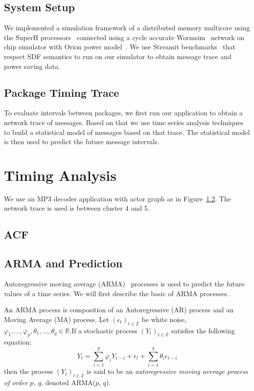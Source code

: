 \documentclass[12pt]{article}
\begin{document}
\subsection{System Setup}
We implemented a simulation framework of a distributed memory multicore using
the SuperH processors~\cite{Stanley-MarbellSunflower} connected using a
cycle accurate Wormsim~\cite{Wormsim} network on chip simulator with Orion power
model~\cite{WangOrion}. We use Streamit benchmarks~\cite{ThiesStreamIt} that
respect SDF semantics to run on our simulator to obtain message trace and power
saving data.

\subsection{Package Timing Trace}
To evaluate intervals between packages, we first run our application to obtain a
network trace of messages. Based on that we use time series analysis
techniques~\cite{BrillingerTimeSeries, ShumwayTimeSeries} to build a statistical
model of messages based on that trace. The statistical model is then used to
predict the future message intervals. 
\section{Timing Analysis}
We use an MP3 decoder application with actor graph as in Figure~\ref{}. The
network trace is used is between cluster 4 and 5.

\subsection{ACF}
\subsection{ARMA and Prediction}
Autoregressive moving average (ARMA)~\cite{BoxTimeSeries, FalkStatSAS}
 processes is used to predict the future values of a time series. We will first
 describe the basic of ARMA processes.
 
 An ARMA process is composition of an Autoregressive (AR) process and an Moving
 Average (MA) process. Let $(\epsilon_t)_{t\in \mathbb{Z}}$ be white noise,
 $\varphi_1, \ldots, \varphi_p, \theta_1, \ldots, \theta_q\in\mathbb{R}$.If a
stochastic process $(Y_t)_{t\in \mathbb{Z}}$ satisfies the following
 equation:
 \begin{equation}\label{eqn:ARMA}
 Y_t=\sum_{i=1}^{p}\varphi_iY_{t-i}+
 \epsilon_t +\sum_{i=1}^{q}\theta_i\epsilon_{t-i}
 \end{equation}
then the process $(Y_t)_{t\in \mathbb{Z}}$ is said to be
an \textit{autoregressive moving average process of order $p$, $q$}, denoted
ARMA($p$, $q$).
\end{document}
